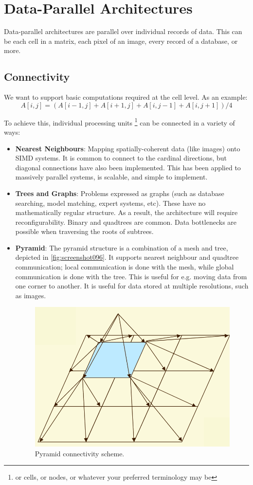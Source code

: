\chapter{Data-Parallel Architectures}
Data-parallel architectures are parallel over individual records of data. This can be each cell in a matrix, each pixel of an image, every record of a database, or more.

\section{Connectivity}
\label{sec:connectivity}
We want to support basic computations required at the cell level. As an example:
\[ A[i,j] = (A[i-1,j] + A[i+1,j] + A[i,j-1] + A[i,j+1])/4 \]

To achieve this, individual processing units \footnote{or cells, or nodes, or whatever your preferred terminology may be} can be connected in a variety of ways: \begin{itemize}
\item \textbf{Nearest Neighbours}: Mapping spatially-coherent data (like images) onto SIMD systems. It is common to connect to the cardinal directions, but diagonal connections have also been implemented. This has been applied to massively parallel systems, is scalable, and simple to implement.
\item \textbf{Trees and Graphs}: Problems expressed as graphs (such as database searching, model matching, expert systems, etc). These have no mathematically regular structure. As a result, the architecture will require reconfigurability. Binary and quadtrees are common. Data bottlenecks are possible when traversing the roots of subtrees.
\item \textbf{Pyramid}: The pyramid structure is a combination of a mesh and tree, depicted in \autoref{fig:screenshot096}. It supports nearest neighbour and quadtree communication; local communication is done with the mesh, while global communication is done with the tree. This is useful for e.g. moving data from one corner to another. It is useful for data stored at multiple resolutions, such as images.

\begin{figure}
\centering
\includegraphics[width=0.5\linewidth]{figures/screenshot096}
\caption{Pyramid connectivity scheme.}
\label{fig:screenshot096}
\end{figure}


\end{itemize}
